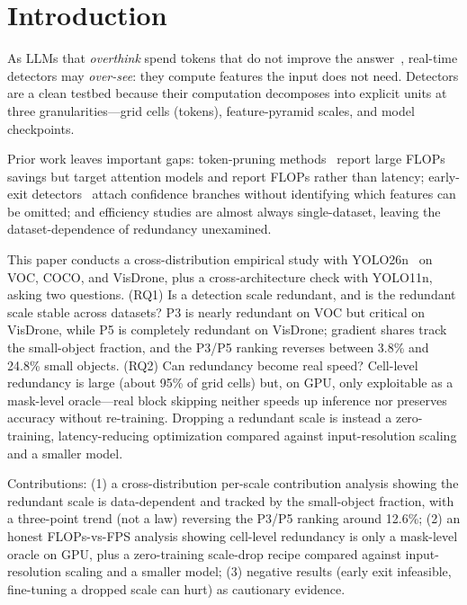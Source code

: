 \documentclass[a4paper,fleqn]{cas-dc}
\begin{document}
\maketitle

\section{Introduction}
As LLMs that \emph{overthink} spend tokens that do not improve the answer~\cite{wei2022chain,feng2025efficient}, real-time detectors may \emph{over-see}: they compute features the input does not need. Detectors are a clean testbed because their computation decomposes into explicit units at three granularities---grid cells (tokens), feature-pyramid scales, and model checkpoints.

Prior work leaves important gaps: token-pruning methods~\cite{rao2021dynamicvit,liang2022evit,bolya2023tome,meng2021adavit} report large FLOPs savings but target attention models and report FLOPs rather than latency; early-exit detectors~\cite{teerapittayanon2016branchynet,scholte2025eobranch,anytimeyolo2025} attach confidence branches without identifying which features can be omitted; and efficiency studies are almost always single-dataset, leaving the dataset-dependence of redundancy unexamined.

This paper conducts a cross-distribution empirical study with YOLO26n~\cite{jocher2026ultralyticsyolo26unifiedrealtime} on VOC, COCO, and VisDrone, plus a cross-architecture check with YOLO11n, asking two questions. (RQ1) Is a detection scale redundant, and is the redundant scale stable across datasets? P3 is nearly redundant on VOC but critical on VisDrone, while P5 is completely redundant on VisDrone; gradient shares track the small-object fraction, and the P3/P5 ranking reverses between 3.8\% and 24.8\% small objects. (RQ2) Can redundancy become real speed? Cell-level redundancy is large (about 95\% of grid cells) but, on GPU, only exploitable as a mask-level oracle---real block skipping neither speeds up inference nor preserves accuracy without re-training. Dropping a redundant scale is instead a zero-training, latency-reducing optimization compared against input-resolution scaling and a smaller model.

Contributions: (1) a cross-distribution per-scale contribution analysis showing the redundant scale is data-dependent and tracked by the small-object fraction, with a three-point trend (not a law) reversing the P3/P5 ranking around 12.6\%; (2) an honest FLOPs-vs-FPS analysis showing cell-level redundancy is only a mask-level oracle on GPU, plus a zero-training scale-drop recipe compared against input-resolution scaling and a smaller model; (3) negative results (early exit infeasible, fine-tuning a dropped scale can hurt) as cautionary evidence.
\end{document}
